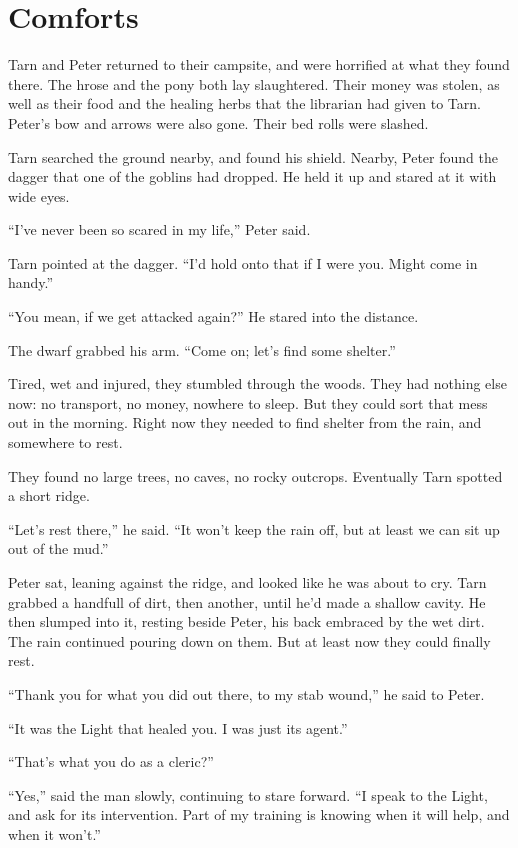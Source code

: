 \chapter{Comforts}

Tarn and Peter returned to their campsite, and were horrified at what they found there.  The hrose and the pony both lay slaughtered.  Their money was stolen, as well as their food and the healing herbs that the librarian had given to Tarn.  Peter's bow and arrows were also gone.  Their bed rolls were slashed.

Tarn searched the ground nearby, and found his shield.  Nearby, Peter found the dagger that one of the goblins had dropped.  He held it up and stared at it with wide eyes.

``I've never been so scared in my life,'' Peter said.

Tarn pointed at the dagger.  ``I'd hold onto that if I were you.  Might come in handy.''

``You mean, if we get attacked again?''  He stared into the distance.

The dwarf grabbed his arm.  ``Come on; let's find some shelter.''

Tired, wet and injured, they stumbled through the woods.  They had nothing else now: no transport, no money, nowhere to sleep.  But they could sort that mess out in the morning.  Right now they needed to find shelter from the rain, and somewhere to rest.

They found no large trees, no caves, no rocky outcrops.  Eventually Tarn spotted a short ridge.

``Let's rest there,'' he said.  ``It won't keep the rain off, but at least we can sit up out of the mud.''

Peter sat, leaning against the ridge, and looked like he was about to cry.  Tarn grabbed a handfull of dirt, then another, until he'd made a shallow cavity.  He then slumped into it, resting beside Peter, his back embraced by the wet dirt.  The rain continued pouring down on them.  But at least now they could finally rest.

``Thank you for what you did out there, to my stab wound,'' he said to Peter.

``It was the Light that healed you.  I was just its agent.''

``That's what you do as a cleric?''

``Yes,'' said the man slowly, continuing to stare forward.  ``I speak to the Light, and ask for its intervention.  Part of my training is knowing when it will help, and when it won't.''

